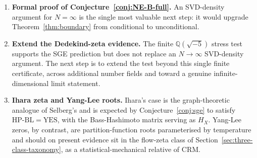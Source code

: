 \documentclass[11pt]{article}
\theoremstyle{definition}
\theoremstyle{remark}
\newcommand{\HBL}{\mathrm{HP\text{-}BL}}
\begin{document}
\begin{enumerate}
\item \textbf{Formal proof of Conjecture~\ref{conj:NE-B-full}.} An
  SVD-density argument for $N = \infty$ is the single most valuable
  next step: it would upgrade Theorem~\ref{thm:boundary} from
  conditional to unconditional.
\item \textbf{Extend the Dedekind-zeta evidence.} The finite
  $\mathbb{Q}(\sqrt{-5})$ stress test supports the SGE prediction but
  does not replace an $N\to\infty$ SVD-density argument. The next step is
  to extend the test beyond this single finite certificate, across
  additional number fields and toward a genuine infinite-dimensional
  limit statement.
\item \textbf{Ihara zeta and Yang-Lee roots.} Ihara's case is the
  graph-theoretic analogue of Selberg's and is expected by
  Conjecture~\ref{conj:sge} to satisfy $\HBL = \mathrm{YES}$, with
  the Bass-Hashimoto matrix serving as $H_X$. Yang-Lee zeros, by
  contrast, are partition-function roots parameterised by
  temperature and should on present evidence sit in the flow-zeta
  class of Section~\ref{sec:three-class-taxonomy}, as a
  statistical-mechanical relative of CRM.


\end{enumerate}
\end{document}

